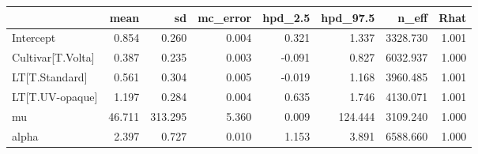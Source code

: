 \begin{tabular}{lrrrrrrr}
\toprule
{} &   mean &      sd &  mc\_error &  hpd\_2.5 &  hpd\_97.5 &    n\_eff &  Rhat \\
\midrule
Intercept         &  0.854 &   0.260 &     0.004 &    0.321 &     1.337 & 3328.730 & 1.001 \\
Cultivar[T.Volta] &  0.387 &   0.235 &     0.003 &   -0.091 &     0.827 & 6032.937 & 1.000 \\
LT[T.Standard]    &  0.561 &   0.304 &     0.005 &   -0.019 &     1.168 & 3960.485 & 1.001 \\
LT[T.UV-opaque]   &  1.197 &   0.284 &     0.004 &    0.635 &     1.746 & 4130.071 & 1.001 \\
mu                & 46.711 & 313.295 &     5.360 &    0.009 &   124.444 & 3109.240 & 1.000 \\
alpha             &  2.397 &   0.727 &     0.010 &    1.153 &     3.891 & 6588.660 & 1.000 \\
\bottomrule
\end{tabular}
